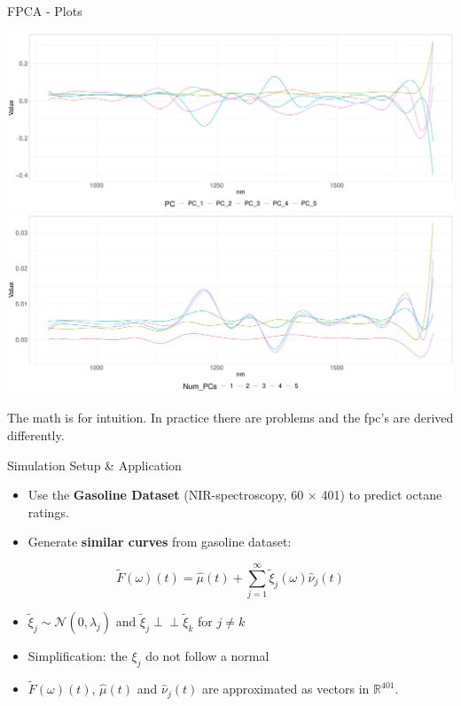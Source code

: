 \documentclass{beamer}
\newcommand{\independent}{\perp\!\!\!\!\perp}
\begin{document}
	\begin{frame}{FPCA - Plots}
		\begin{minipage}[c]{0.78\textwidth}
			\includegraphics[width = \textwidth]{../Graphics/principal_components.pdf}
			\includegraphics[width = \textwidth]{../Graphics/pc_approx.pdf}
		\end{minipage}
		\begin{minipage}[c]{0.19\textwidth}
			The math is for intuition. In practice there are problems and the fpc's are derived differently.
		\end{minipage}
	\end{frame}
	

	\begin{frame}{Simulation Setup \& Application}
		\begin{itemize}
			\item Use the \textbf{Gasoline Dataset} (NIR-spectroscopy, 60 $\times$ 401) to predict octane ratings.
			\item Generate \textbf{similar curves} from gasoline dataset:
		\end{itemize}
	
		$$\tilde{F}(\omega)(t) = \hat{\mu}(t) + \sum_{j = 1}^{\infty} \tilde{\xi}_j(\omega) \hat{\nu}_j(t)$$ 

		\begin{itemize}
			\item $\tilde{\xi}_{j} \sim \mathcal{N}(0,\hat{\lambda}_j)$ and $\tilde{\xi}_{j} \independent \tilde{\xi}_{k}$ for $j \neq k$
			\item Simplification: the $\xi_{j}$ do not follow a normal
			\item $\tilde{F}(\omega)(t)$, $\hat{\mu}(t)$ and $\hat{\nu}_j(t)$ are approximated as vectors in $\mathbb{R}^{401}$.
		\end{itemize}
		
	\end{frame}
	
\end{document}
